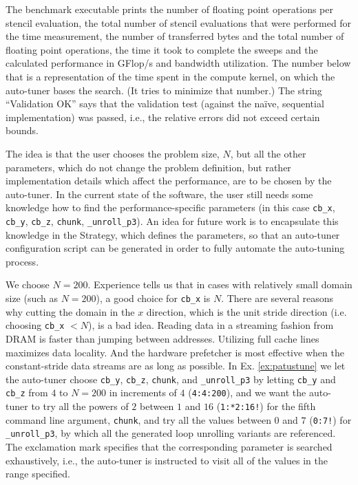 The benchmark executable prints the number of floating point operations per stencil evaluation, the
total number of stencil evaluations that were performed for the time measurement, the number of
transferred bytes and the total number of floating point operations, the time it took to complete
the sweeps and the calculated performance in GFlop/s and bandwidth utilization. The number below that
is a representation of the time spent in the compute kernel, on which the auto-tuner bases the search.
(It tries to minimize that number.) The string ``Validation OK'' says that the validation test (against
the na\"ive, sequential implementation) was passed, i.e., the relative errors did not exceed certain bounds.

The idea is that the user chooses the problem size, $N$, but all the other parameters, which do not change
the problem definition, but rather implementation details which affect the performance, are to be chosen
by the auto-tuner. In the current state of the software, the user still needs some knowledge how to find
the performance-specific parameters (in this case \texttt{cb\_x}, \texttt{cb\_y}, \texttt{cb\_z}, \texttt{chunk},
\texttt{\_unroll\_p3}). An idea for future work is to encapsulate this knowledge in the Strategy, which
defines the parameters, so that an auto-tuner configuration script can be generated in order to fully automate the auto-tuning process.

We choose $N=200$.
Experience tells us that in cases with relatively small domain size (such as $N=200$), a good choice for
\texttt{cb\_x} is $N$. There are several reasons why cutting the domain in the $x$ direction, which is the
unit stride direction (i.e. choosing \texttt{cb\_x} $< N$), is a bad idea. Reading data in a streaming fashion
from DRAM is faster than jumping between addresses. Utilizing full cache lines maximizes data locality.
And the hardware prefetcher is most effective when the constant-stride data streams are as long as possible.
In Ex. \ref{ex:patustune} we let the auto-tuner choose \texttt{cb\_y}, \texttt{cb\_z}, \texttt{chunk},
and \texttt{\_unroll\_p3} by letting \texttt{cb\_y} and \texttt{cb\_z} from $4$ to $N=200$ in increments of $4$
(\texttt{4:4:200}),
and we want the auto-tuner to try all the powers of $2$ between $1$ and $16$ (\texttt{1:*2:16!}) for the fifth command line
argument, \texttt{chunk}, and try all the values between $0$ and $7$ (\texttt{0:7!}) for \texttt{\_unroll\_p3}, by which
all the generated loop unrolling variants are referenced. The exclamation mark specifies that the corresponding
parameter is searched exhaustively, i.e., the auto-tuner is instructed to visit all of the values in the
range specified.


